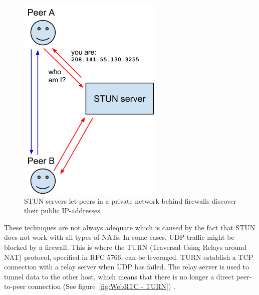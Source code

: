 \begin{figure}[htp]
\centering
\includegraphics[width=\textwidth,height=0.2\paperheight,keepaspectratio
]{figures/webrtc-stun}
\caption{STUN servers let peers in a private network behind firewalls discover their public IP-addresses\cite{WebRTCArchitecture:2014:Online}.}
\label{fig:WebRTC - STUN}
\end{figure}

These techniques are not always adequate which is caused by the fact that STUN does not work with all types of NATs. In some cases, UDP traffic might be blocked by a firewall. This is where the TURN (Traversal Using Relays around NAT) protocol, specified in RFC 5766, can be leveraged.  TURN establish a TCP connection with a relay server when UDP has failed. The relay server is used to tunnel data to the other host, which means that there is no longer a direct peer-to-peer connection (See figure~\ref{fig:WebRTC - TURN}) \cite{RFC5766:Online}.

